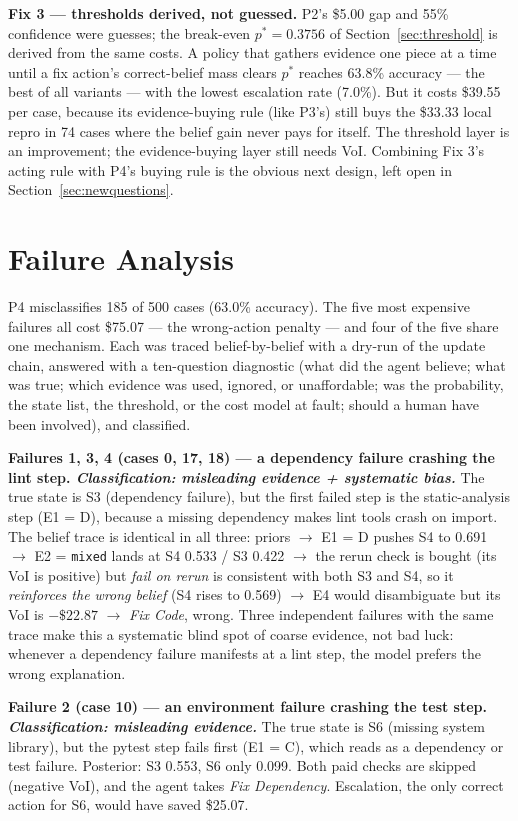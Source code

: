 \documentclass{article}
\begin{document}
\textbf{Fix 3 --- thresholds derived, not guessed.} P2's \$5.00 gap and 55\% confidence were guesses; the break-even $p^* = 0.3756$ of Section~\ref{sec:threshold} is derived from the same costs. A policy that gathers evidence one piece at a time until a fix action's correct-belief mass clears $p^*$ reaches 63.8\% accuracy --- the best of all variants --- with the lowest escalation rate (7.0\%). But it costs \$39.55 per case, because its evidence-buying rule (like P3's) still buys the \$33.33 local repro in 74 cases where the belief gain never pays for itself. The threshold layer is an improvement; the evidence-buying layer still needs VoI. Combining Fix 3's acting rule with P4's buying rule is the obvious next design, left open in Section~\ref{sec:newquestions}.

\section{Failure Analysis}
\label{sec:failures}

P4 misclassifies 185 of 500 cases (63.0\% accuracy). The five most expensive failures all cost \$75.07 --- the wrong-action penalty --- and four of the five share one mechanism. Each was traced belief-by-belief with a dry-run of the update chain, answered with a ten-question diagnostic (what did the agent believe; what was true; which evidence was used, ignored, or unaffordable; was the probability, the state list, the threshold, or the cost model at fault; should a human have been involved), and classified.

\textbf{Failures 1, 3, 4 (cases 0, 17, 18) --- a dependency failure crashing the lint step. \emph{Classification: misleading evidence + systematic bias.}} The true state is S3 (dependency failure), but the first failed step is the static-analysis step (E1 = D), because a missing dependency makes lint tools crash on import. The belief trace is identical in all three: priors $\to$ E1 = D pushes S4 to 0.691 $\to$ E2 = \texttt{mixed} lands at S4 0.533 / S3 0.422 $\to$ the rerun check is bought (its VoI is positive) but \emph{fail on rerun} is consistent with both S3 and S4, so it \emph{reinforces the wrong belief} (S4 rises to 0.569) $\to$ E4 would disambiguate but its VoI is $-\$22.87$ $\to$ \emph{Fix Code}, wrong. Three independent failures with the same trace make this a systematic blind spot of coarse evidence, not bad luck: whenever a dependency failure manifests at a lint step, the model prefers the wrong explanation.

\textbf{Failure 2 (case 10) --- an environment failure crashing the test step. \emph{Classification: misleading evidence.}} The true state is S6 (missing system library), but the pytest step fails first (E1 = C), which reads as a dependency or test failure. Posterior: S3 0.553, S6 only 0.099. Both paid checks are skipped (negative VoI), and the agent takes \emph{Fix Dependency}. Escalation, the only correct action for S6, would have saved \$25.07.
\end{document}
